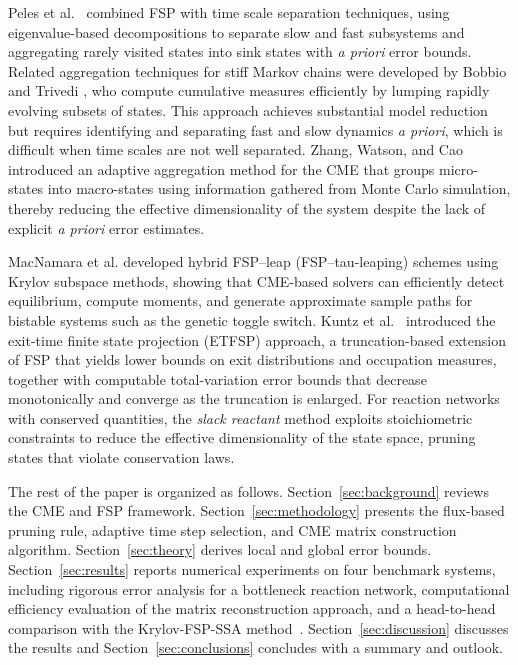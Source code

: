 \documentclass[onefignum,onetabnum]{siamart171218}
\begin{document}
Peles et al.~\cite{peles} combined FSP with time scale separation techniques, using eigenvalue-based decompositions to separate slow and fast subsystems and aggregating rarely visited states into sink states with \emph{a priori} error bounds. Related aggregation techniques for stiff Markov chains were developed by Bobbio and Trivedi \cite{aggregation}, who compute cumulative measures efficiently by lumping rapidly evolving subsets of states. This approach achieves substantial model reduction but requires identifying and separating fast and slow dynamics \emph{a priori}, which is difficult when time scales are not well separated. Zhang, Watson, and Cao \cite{zhang_cao} introduced an adaptive aggregation method for the CME that groups micro-states into macro-states using information gathered from Monte Carlo simulation, thereby reducing the effective dimensionality of the system despite the lack of explicit \emph{a priori} error estimates.

MacNamara et al.\cite{shev} developed hybrid FSP--leap (FSP--tau-leaping) schemes using Krylov subspace methods, showing that CME-based solvers can efficiently detect equilibrium, compute moments, and generate approximate sample paths for bistable systems such as the genetic toggle switch. Kuntz et al.~\cite{kuntz2010} introduced the exit-time finite state projection (ETFSP) approach, a truncation-based extension of FSP that yields lower bounds on exit distributions and occupation measures, together with computable total-variation error bounds that decrease monotonically and converge as the truncation is enlarged. For reaction networks with conserved quantities, the \textit{slack reactant} method \cite{slack} exploits stoichiometric constraints to reduce the effective dimensionality of the state space, pruning states that violate conservation laws.

The rest of the paper is organized as follows. Section~\ref{sec:background} reviews the CME and FSP framework. Section~\ref{sec:methodology} presents the flux-based pruning rule, adaptive time step selection, and CME matrix construction algorithm. Section~\ref{sec:theory} derives local and global error bounds. Section~\ref{sec:results} reports numerical experiments on four benchmark systems, including rigorous error analysis for a bottleneck reaction network, computational efficiency evaluation of the matrix reconstruction approach, and a head-to-head comparison with the Krylov-FSP-SSA method~\cite{Sidje2015}. Section~\ref{sec:discussion} discusses the results and Section~\ref{sec:conclusions} concludes with a summary and outlook.
\end{document}
